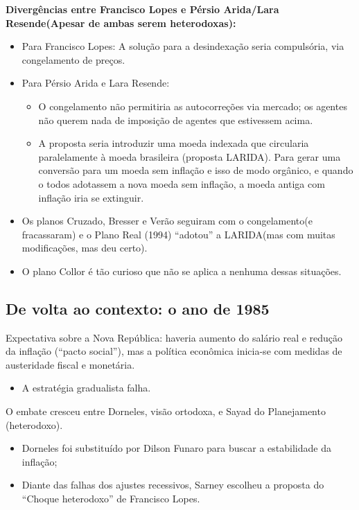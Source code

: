 \documentclass[a4paper,12pt]{article}[abntex2]
\begin{document}
\textbf{Divergências entre Francisco Lopes e Pérsio Arida/Lara Resende(Apesar de ambas serem heterodoxas):}
\begin{itemize}
    \item Para Francisco Lopes: A solução para a desindexação seria compulsória, via congelamento de preços.
    \item Para Pérsio Arida e Lara Resende:
    \begin{itemize}
        \item O congelamento não permitiria as autocorreções via mercado; os agentes não querem nada de imposição de agentes que estivessem acima.
        \item A proposta seria introduzir uma moeda indexada que circularia paralelamente à moeda brasileira (proposta LARIDA). Para gerar uma conversão para um moeda sem inflação e isso de modo orgânico, e quando o todos adotassem a nova moeda sem inflação, a moeda antiga com inflação iria se extinguir.
    \end{itemize}
    \item Os planos Cruzado, Bresser e Verão seguiram com o congelamento(e fracassaram) e o Plano Real (1994) ``adotou'' a LARIDA(mas com muitas modificações, mas deu certo).
    \item O plano Collor é tão curioso que não se aplica a nenhuma dessas situações.
\end{itemize}

\subsection{\textbf{De volta ao contexto: o ano de 1985}}

Expectativa sobre a Nova República: haveria aumento do salário real e redução da inflação (``pacto social''), mas a política econômica inicia-se com medidas de austeridade fiscal e monetária.\begin{itemize}
    \item A estratégia gradualista falha.
\end{itemize}

O embate cresceu entre Dorneles, visão ortodoxa, e Sayad do Planejamento (heterodoxo).\begin{itemize}
    \item Dorneles foi substituído por Dilson Funaro para buscar a estabilidade da inflação;
    \item Diante das falhas dos ajustes recessivos, Sarney escolheu a proposta do ``Choque heterodoxo'' de Francisco Lopes.
\end{itemize}
\end{document}

